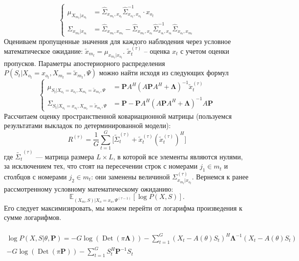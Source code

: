 \documentclass[11pt]{article}
\newcommand{\Expect}{\mathbb{E}}
\DeclareMathOperator{\Det}{Det}
\begin{document}
\begin{equation}
\left\{ \begin{aligned} 
\mu_{X_{m_t}|x_{o_t}} &= \hat{\Sigma}_{x_{m_t},x_{o_t}}\hat{\Sigma}_{x_{o_t},x_{o_t}}^{-1}\cdot x_{o_t} \\
\Sigma_{x_{m_t}|x_{o_t}} &= \hat{\Sigma}_{x_{m_t},x_{m_t}}-\hat{\Sigma}_{x_{m_t},x_{o_t}}\hat{\Sigma}_{x_{o_t},x_{o_t}}^{-1}\hat{\Sigma}_{x_{o_t},x_{m_t}}
\end{aligned} \right.
\end{equation}
Оцениваем пропущенные значения для каждого наблюдения через условное математическое ожидание:
$\widetilde{x}_{m_t} = \mu_{x_{m_t}|x_{o_t}}$. $\widetilde{x}_t^{(\tau)}$ -- оценка $x_t$ с учетом оценки пропусков.
Параметры апостериорного распределения $P(S_t|X_{o_t} = x_{o_t}, X_{m_t} = \widetilde{x}_{m_t}, \Psi)$ можно найти исходя из следующих формул
\begin{equation}
\left\{ \begin{aligned} 
\mu_{S_t|X_{o_t} = x_{o_t}, X_{m_t} = \widetilde{x}_{m_t}, \Psi} &= \mathbf{P}A^H(A\mathbf{P}A^H+\mathbf{\Lambda})^{-1}\widetilde{x}_t^{(\tau)} \\
\Sigma_{S_t|X_{o_t} = x_{o_t}, X_{m_t} = \widetilde{x}_{m_t}, \Psi} &= \mathbf{P} - \mathbf{P}A^H(A\mathbf{P}A^H+\mathbf{\Lambda})^{-1}A\mathbf{P}
\end{aligned} \right.
\end{equation}
Рассчитаем оценку пространственной ковариационной матрицы (пользуемся результатами выкладок по детерминированной модели):
\begin{equation}
{R}^{(\tau)} = \frac{1}{G} \sum_{t = 1}^{G} \Big[ \widetilde{\Sigma}_{t}^{(\tau)} + \widetilde{x}_t^{(\tau)}(\widetilde{x}_t^{(\tau)})^H \Big]
\end{equation}
где $\widetilde{\Sigma_{t}}^{(\tau)}$ --- матрица размера $L \times L$, в которой все элементы являются нулями, за исключением тех, что стоят на пересечении строк с номерами $j_1 \in m_t$ и столбцов с номерами $j_2 \in m_t$: они заменены величиной $\Sigma^{(\tau)}_{x_{m_t}|x_{o_t}}$.
Вернемся к ранее рассмотренному условному математическому ожиданию:
\begin{equation*}
 \Expect_{(X_m,S)|X_o=x_o, \Psi^{(\tau-1)}}[\log P(X, S)].
\end{equation*}
Его следует максимизировать, мы можем перейти от логарифма произведения к сумме логарифмов. 
\\
\\
\begin{equation*}
\begin{gathered}
\log P(X,S|\theta, \mathbf{P}) = -G \log (\Det(\pi \mathbf{\Lambda})) - \sum_{t=1}^G (X_t-A(\theta)S_t)^H \mathbf{\Lambda}^{-1}(X_t-A(\theta)S_t) 
\\ - G \log(\Det(\pi \mathbf{P})) - \sum_{t=1}^G S_t^H \mathbf{P}^{-1}S_t
\end{gathered}
\end{equation*}
\end{document}
